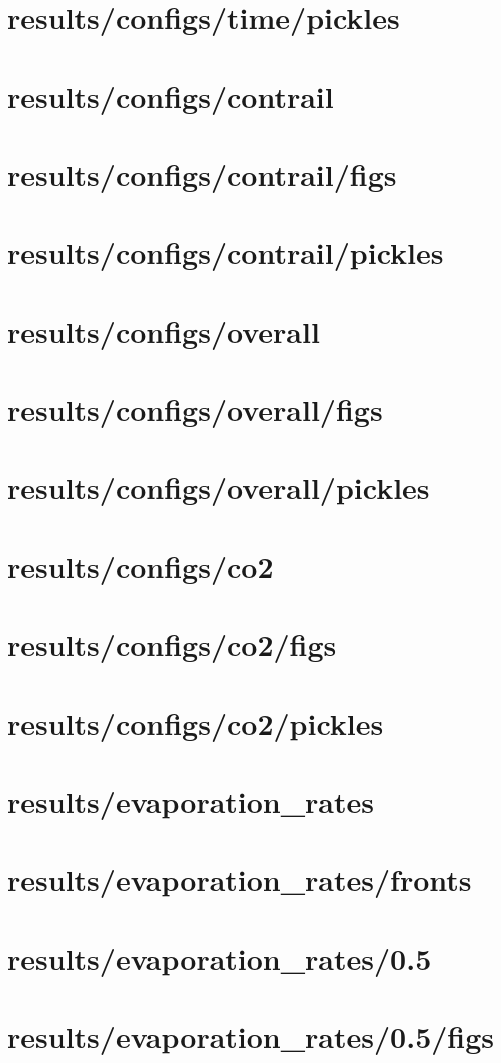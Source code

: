 \section{results/configs/time/pickles}
\section{results/configs/contrail}
\section{results/configs/contrail/figs}
\section{results/configs/contrail/pickles}
\section{results/configs/overall}
\section{results/configs/overall/figs}
\section{results/configs/overall/pickles}
\section{results/configs/co2}
\section{results/configs/co2/figs}
\section{results/configs/co2/pickles}
\section{results/evaporation_rates}
\section{results/evaporation_rates/fronts}
\section{results/evaporation_rates/0.5}
\section{results/evaporation_rates/0.5/figs}

